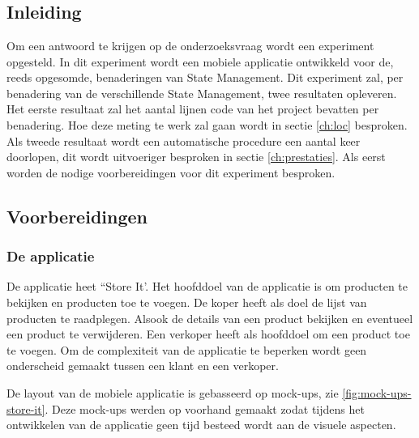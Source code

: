 
\chapter{}
\label{ch:methodologie}

\section{Inleiding}
Om een antwoord te krijgen op de onderzoeksvraag wordt een experiment opgesteld. In dit experiment wordt een mobiele applicatie ontwikkeld voor de, reeds opgesomde, benaderingen van State Management. Dit experiment zal, per benadering van de verschillende State Management, twee resultaten opleveren. Het eerste resultaat zal het aantal lijnen code van het project bevatten per benadering. Hoe deze meting te werk zal gaan wordt in sectie \ref{ch:loc} besproken. Als tweede resultaat wordt een automatische procedure een aantal keer doorlopen, dit wordt uitvoeriger besproken in sectie \ref{ch:prestaties}. \newline
Als eerst worden de nodige voorbereidingen voor dit experiment besproken.

\section{Voorbereidingen}
\subsection{De applicatie}
De applicatie heet ``Store It'. Het hoofddoel van de applicatie is om producten te bekijken en producten toe te voegen. De koper heeft als doel de lijst van producten te raadplegen. Alsook de details van een product bekijken en eventueel een product te verwijderen. Een verkoper heeft als hoofddoel om een product toe te voegen. Om de complexiteit van de applicatie te beperken wordt geen onderscheid gemaakt tussen een klant en een verkoper.\newline

De layout van de mobiele applicatie is gebasseerd op mock-ups, zie \ref{fig:mock-ups-store-it}. Deze mock-ups werden op voorhand gemaakt zodat tijdens het ontwikkelen van de applicatie geen tijd besteed wordt aan de visuele aspecten.

